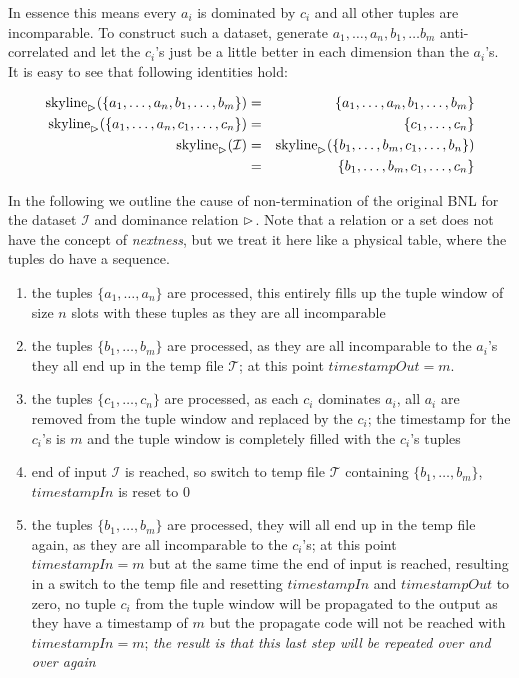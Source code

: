 \noindent
In essence this means every $a_i$ is dominated by $c_i$ and all other
tuples are incomparable.  To construct such a dataset, generate $a_1,
\ldots, a_n, b_1, \ldots b_m$ anti-correlated and let the $c_i$'s just be
a little better in each dimension than the $a_i$'s.  It is easy to see
that following identities hold:

\begin{eqnarray}
\skyline_\dominates(\{a_1, \ldots, a_n, b_1, \ldots, b_m\}) &=& \{a_1, \ldots, a_n, b_1, \ldots, b_m\} \\
\skyline_\dominates(\{a_1, \ldots, a_n, c_1, \ldots, c_n\}) &=& \{c_1, \ldots, c_n\} \\
\skyline_\dominates(\mathcal{I}) &=& \skyline_\dominates(\{b_1, \ldots, b_m, c_1, \ldots, b_n\}) \\
                      &=& \{b_1, \ldots, b_m, c_1, \ldots, c_n\}
\end{eqnarray}

In the following we outline the cause of non-termination of the
original BNL for the dataset $\mathcal{I}$ and dominance relation
$\vartriangleright$.  Note that a relation or a set does not have the concept
of \emph{nextness}, but we treat it here like a physical table, where
the tuples do have a sequence.

\begin{enumerate}
\item 
the tuples $\{a_1, \ldots, a_n\}$ are processed, this entirely fills up
the tuple window of size $n$ slots with these tuples as they are all
incomparable

\item 
the tuples $\{b_1, \ldots, b_m\}$ are processed, as they are all
incomparable to the $a_i$'s they all end up in the temp file
$\mathcal{T}$; at this point $timestampOut = m$.

\item
the tuples $\{c_1, \ldots, c_n\}$ are processed, as each $c_i$
dominates $a_i$, all $a_i$ are removed from the tuple window and
replaced by the $c_i$; the timestamp for the $c_i$'s is $m$ and the
tuple window is completely filled with the $c_i$'s tuples

\item
end of input $\mathcal{I}$ is reached, so switch to temp file
$\mathcal{T}$ containing $\{b_1, \ldots, b_m\}$, $timestampIn$ is
reset to $0$

\item
the tuples $\{b_1, \ldots, b_m\}$ are processed, they will all end up
in the temp file again, as they are all incomparable to the $c_i$'s;
at this point $timestampIn = m$ but at the same time the end of input
is reached, resulting in a switch to the temp file and resetting
$timestampIn$ and $timestampOut$ to zero, no tuple $c_i$ from the
tuple window will be propagated to the output as they have a timestamp
of $m$ but the propagate code will not be reached with $timestampIn =
m$;
\emph{the result is that this last step will be repeated over and over again}
\end{enumerate}

